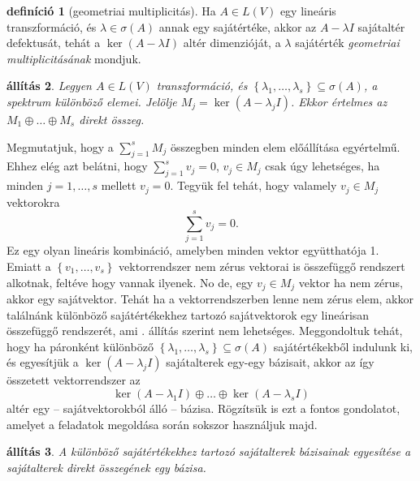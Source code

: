 \documentclass[a4paper, showtrims]{memoir}
\makeatletter
\renewenvironment{proof}[1][\proofname]
    {\par\pushQED{\qed}%
    \normalfont \topsep6\p@\@plus6\p@\relax
    \trivlist
    \item[\hskip\labelsep
        \itshape
    #1\@addpunct{:}]\ignorespaces}
    {\popQED\endtrivlist\@endpefalse}
\theoremstyle{plain}
\newtheorem{proposition}{állítás}[chapter]
\theoremstyle{remark}
\theoremstyle{definition}
\newtheorem{definition}[proposition]{definíció}
\makeatother
\begin{document}
\begin{definition}[geometriai multiplicitás]
	Ha $A\in L\left( V \right)$ egy lineáris transzformáció,
	és $\lambda\in\sigma\left( A \right)$ annak egy sajátértéke,
	akkor az $A-\lambda I$ sajátaltér defektusát,
	tehát a $\ker\left( A-\lambda I \right)$ altér dimenzióját,
	a $\lambda$ sajátérték \emph{geometriai multiplicitásának}
	mondjuk.
\end{definition}
\begin{proposition}
	Legyen $A\in L\left( V \right)$ transzformáció, és
	$\left\{ \lambda_1,\ldots,\lambda_s \right\}\subseteq\sigma\left( A \right)$,
	a spektrum különböző elemei.
	Jelölje $M_j=\ker\left( A-\lambda_j I \right)$.
	Ekkor értelmes az $M_1\oplus\dots\oplus M_s$ direkt összeg.
\end{proposition}
\begin{proof}
	Megmutatjuk, hogy a $\sum_{j=1}^sM_j$ összegben minden elem előállítása egyértelmű.
	Ehhez elég azt belátni, hogy $\sum_{j=1}^sv_j=0$, $v_j\in M_j$ csak úgy lehetséges, ha
	minden $j=1,\ldots,s$ mellett $v_j=0$.
	Tegyük fel tehát, hogy valamely $v_j\in M_j$ vektorokra
	\[
		\sum_{j=1}^sv_j=0.
	\]
	Ez egy olyan lineáris kombináció, amelyben minden vektor együtthatója 1.
	Emiatt a $\left\{ v_1,\ldots,v_s \right\}$ vektorrendszer nem zérus vektorai is összefüggő rendszert alkotnak,
	feltéve hogy vannak ilyenek.
	No de, egy $v_j\in M_j$ vektor ha nem zérus, akkor egy sajátvektor.
	Tehát ha a vektorrendszerben lenne nem zérus elem,
	akkor találnánk különböző sajátértékekhez tartozó sajátvektorok egy lineárisan összefüggő rendszerét,
    ami . állítás szerint nem lehetséges.
\end{proof}
Meggondoltuk tehát,
hogy ha páronként különböző $\left\{ \lambda_1,\ldots,\lambda_s \right\}\subseteq\sigma\left( A \right)$ sajátértékekből indulunk ki,
és egyesítjük a $\ker\left( A-\lambda_j I \right)$ sajátalterek egy-egy bázisait,
akkor az így összetett vektorrendszer az
\[
	\ker\left( A-\lambda_1 I \right)\oplus\dots\oplus\ker\left( A-\lambda_s I \right)
\]
altér egy -- sajátvektorokból álló -- bázisa.
Rögzítsük is ezt a fontos gondolatot,
amelyet a feladatok megoldása során sokszor használjuk majd.
\begin{proposition}
	A különböző sajátértékekhez tartozó sajátalterek bázisainak egyesítése a sajátalterek direkt összegének egy bázisa.
\end{proposition}
\end{document}
